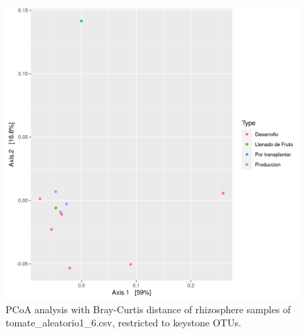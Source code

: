 \begin{figure}
  \centering
  \includegraphics[scale = 0.7]{pcoa_key_otus_tomate_aleatorio1_6.csv.png}
  \caption{PCoA analysis with Bray-Curtis distance of rhizosphere samples of tomate_aleatorio1_6.csv, restricted to keystone OTUs.}
  \label{fig:tomate_aleatorio1_6.csv_pcoa_key_otus}
\end{figure}
